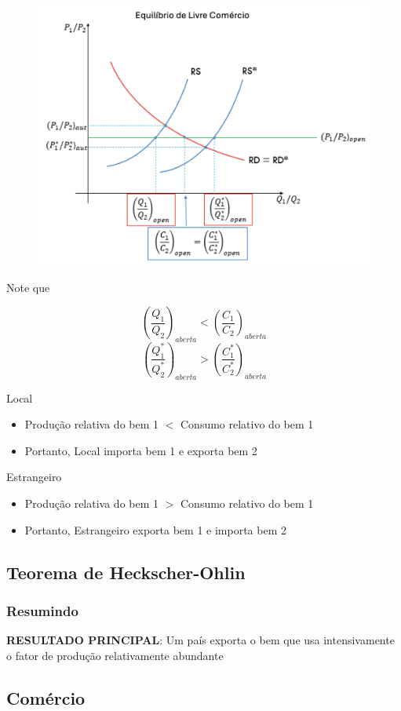 \documentclass[a4paper,12pt]{article}[abntex2]
\begin{document}
\begin{figure}[H]
    \centering
    \includegraphics[width=0.7\linewidth]{Imagens/a12i11.png}
\end{figure}
Note que

\[
\left( \frac{Q_1}{Q_2} \right)_{aberta} < \left( \frac{C_1}{C_2} \right)_{aberta}
\]
\[
\left( \frac{Q_1^*}{Q_2^*} \right)_{aberta} > \left( \frac{C_1^*}{C_2^*} \right)_{aberta}
\]

Local
\begin{itemize}
    \item Produção relativa do bem 1 \( < \) Consumo relativo do bem 1
    \item Portanto, Local importa bem 1 e exporta bem 2
\end{itemize}

Estrangeiro
\begin{itemize}
    \item Produção relativa do bem 1 \( > \) Consumo relativo do bem 1
    \item Portanto, Estrangeiro exporta bem 1 e importa bem 2
\end{itemize}

\subsection{\textbf{Teorema de Heckscher-Ohlin}}
\subsubsection{\textbf{Resumindo}}
\textbf{RESULTADO PRINCIPAL}: Um país exporta o bem que usa intensivamente o fator de produção relativamente abundante

\subsection{\textbf{Comércio}}
\end{document}
